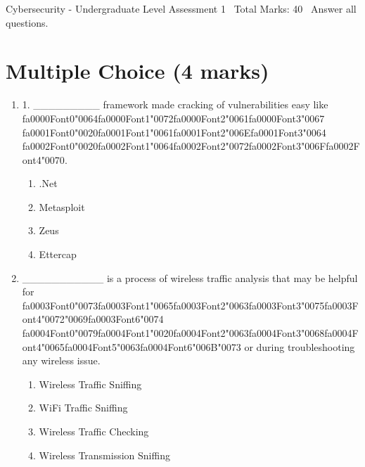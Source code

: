 \documentclass[12pt]{article}
\begin{document}
\begin{center}
Cybersecurity - Undergraduate Level Assessment 1 \
Total Marks: 40 \
Answer all questions.
\end{center}

\section*{Multiple Choice (4 marks)}
\begin{enumerate}[label=\arabic*.]
\item 1. \_\_\_\_\_\_\_\_\_ framework made cracking of vulnerabilities easy like {\csname fa0000Font0\endcsname\char"0064}{\csname fa0000Font1\endcsname\char"0072}{\csname fa0000Font2\endcsname\char"0061}{\csname fa0000Font3\endcsname\char"0067} {\csname fa0001Font0\endcsname\char"0020}{\csname fa0001Font1\endcsname\char"0061}{\csname fa0001Font2\endcsname\char"006E}{\csname fa0001Font3\endcsname\char"0064} {\csname fa0002Font0\endcsname\char"0020}{\csname fa0002Font1\endcsname\char"0064}{\csname fa0002Font2\endcsname\char"0072}{\csname fa0002Font3\endcsname\char"006F}{\csname fa0002Font4\endcsname\char"0070}.
\begin{enumerate}[label=(\alph*)]
    \item .Net
    \item Metasploit
    \item Zeus
    \item Ettercap
\end{enumerate}
\item \_\_\_\_\_\_\_\_\_\_\_ is a process of wireless traffic analysis that may be helpful for {\csname fa0003Font0\endcsname\char"0073}{\csname fa0003Font1\endcsname\char"0065}{\csname fa0003Font2\endcsname\char"0063}{\csname fa0003Font3\endcsname\char"0075}{\csname fa0003Font4\endcsname\char"0072}{\char"0069}{\csname fa0003Font6\endcsname\char"0074} {\csname fa0004Font0\endcsname\char"0079}{\csname fa0004Font1\endcsname\char"0020}{\csname fa0004Font2\endcsname\char"0063}{\csname fa0004Font3\endcsname\char"0068}{\csname fa0004Font4\endcsname\char"0065}{\csname fa0004Font5\endcsname\char"0063}{\csname fa0004Font6\endcsname\char"006B}{\char"0073} or during troubleshooting any wireless issue.
\begin{enumerate}[label=(\alph*)]
    \item Wireless Traffic Sniffing
    \item WiFi Traffic Sniffing
    \item Wireless Traffic Checking
    \item Wireless Transmission Sniffing
\end{enumerate}
\end{enumerate}
\end{document}
